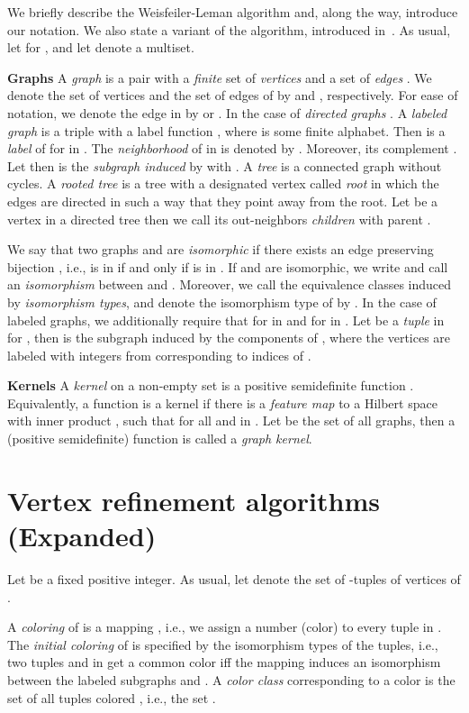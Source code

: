 \documentclass{article}
\newcommand{\xhdr}[1]{{\noindent\bfseries #1}}
\theoremstyle{definition}
\newcommand{\new}[1]{\emph{#1}}
\begin{document}
We briefly describe the Weisfeiler-Leman algorithm and, along the way, introduce our notation. We also state a variant of the algorithm, introduced in~\cite{Mal2014}. As usual, let  for , and let  denote a multiset. 

\xhdr{Graphs} A \new{graph}  is a pair  with a \emph{finite} set of
\new{vertices}  and a set of \new{edges} . We denote the set of vertices and the set
of edges of  by  and , respectively. For ease of
notation, we denote the edge  in  by  or
. In the case of \emph{directed graphs} . A \new{labeled graph}  is a triple
 with a label function ,
where  is some finite alphabet. Then  is a
\new{label} of  for  in . 
The \new{neighborhood} 
of  in  is denoted by . 
Moreover, its complement . 
Let  then  is the \new{subgraph induced} by  with
. A \new{tree} is a connected graph without
cycles. A \new{rooted tree} is a tree with a designated vertex called \new{root} in which the edges are directed in such a way that they point away from the root. 
Let  be a vertex in a directed tree then we call its out-neighbors \new{children} with parent . 

We say that two graphs  and 
are \new{isomorphic} if there exists an edge preserving bijection
, i.e.,  is in  if and only if
 is in . If  and  are isomorphic,
we write  and call  an \new{isomorphism} between
 and . Moreover, we call the equivalence classes induced by
 \emph{isomorphism types}, and denote the isomorphism type of  by
. In the case of labeled graphs, we additionally require that
 for  in  and  for  in . 
Let  be a \emph{tuple} in  for , then  is the subgraph induced by the components of , where the vertices are labeled with integers from  corresponding to indices of . 

\xhdr{Kernels} A \emph{kernel} on a non-empty set  is a positive semidefinite function 
.
Equivalently, a function  is a kernel if there is a \emph{feature map} 
 to a Hilbert space  with inner product 
, such that 
 for all  and  in .
Let  be the set of all graphs, then a (positive semidefinite) function  is called a \emph{graph kernel}.

\section{Vertex refinement algorithms (Expanded)}\label{vr}

Let  be a fixed positive integer. As usual, let  denote the set of -tuples of vertices of . 

A \new{coloring} of  is a mapping , i.e., we assign a number (color) to every tuple in . The \new{initial coloring}  of  is specified by the isomorphism types of the tuples, i.e., two tuples  and  in  get a common color iff the mapping  induces an isomorphism between the labeled subgraphs  and . A \new{color class} corresponding to a color  is the set of all tuples colored ,
i.e., the set . 
\end{document}
